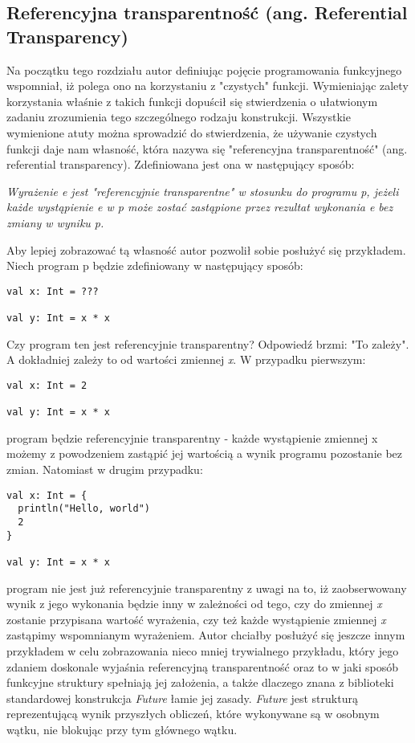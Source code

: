 \documentclass[../main.tex]{subfiles}
\begin{document}
\subsection{Referencyjna transparentność (ang. Referential Transparency)}
Na początku tego rozdziału autor definiując pojęcie programowania funkcyjnego wspomniał, iż polega ono na korzystaniu z "czystych" funkcji. Wymieniając zalety korzystania właśnie z takich funkcji dopuścił się stwierdzenia o ułatwionym zadaniu zrozumienia tego szczególnego rodzaju konstrukcji. Wszystkie wymienione atuty można sprowadzić do stwierdzenia, że używanie czystych funkcji daje nam własność, która nazywa się "referencyjna transparentność" (ang. referential transparency).
Zdefiniowana jest ona w następujący sposób:
\begin{center}
\textit{Wyrażenie e jest "referencyjnie transparentne" w stosunku do programu p, jeżeli każde wystąpienie e w p może zostać zastąpione przez rezultat wykonania e bez zmiany w wyniku p.} \cite{BOOK:FPinScala} 
\end{center}
Aby lepiej zobrazować tą własność autor pozwolił sobie posłużyć się przykładem.
Niech program p będzie zdefiniowany w następujący sposób:
\begin{lstlisting}[caption=Przykładowy program w języku Scala.]
val x: Int = ???

val y: Int = x * x
\end{lstlisting}
Czy program ten jest referencyjnie transparentny? Odpowiedź brzmi: "To zależy". A dokładniej zależy to od wartości zmiennej \textit{x}. W przypadku pierwszym:
\begin{lstlisting}[caption=Referencyjnie transparentny program.]
val x: Int = 2

val y: Int = x * x
\end{lstlisting}
program będzie referencyjnie transparentny - każde wystąpienie zmiennej x możemy z powodzeniem zastąpić jej wartością a wynik programu pozostanie bez zmian.
Natomiast w drugim przypadku:
\begin{lstlisting}[caption=Program który nie jest referencyjnie transparentny.]
val x: Int = {
  println("Hello, world")
  2
}

val y: Int = x * x
\end{lstlisting}
program nie jest już referencyjnie transparentny z uwagi na to, iż zaobserwowany wynik z jego wykonania będzie inny w zależności od tego, czy do zmiennej \textit{x} zostanie przypisana wartość wyrażenia, czy też każde wystąpienie zmiennej \textit{x} zastąpimy wspomnianym wyrażeniem.\newline
Autor chciałby posłużyć się jeszcze innym przykładem w celu zobrazowania nieco mniej trywialnego przykładu, który jego zdaniem doskonale wyjaśnia referencyjną transparentność oraz to w jaki sposób funkcyjne struktury spełniają jej założenia, a także dlaczego znana z biblioteki standardowej konstrukcja \textit{Future} łamie jej zasady. \textit{Future} jest strukturą reprezentującą wynik przyszłych obliczeń, które wykonywane są w osobnym wątku, nie blokując przy tym głównego wątku.
\end{document}
